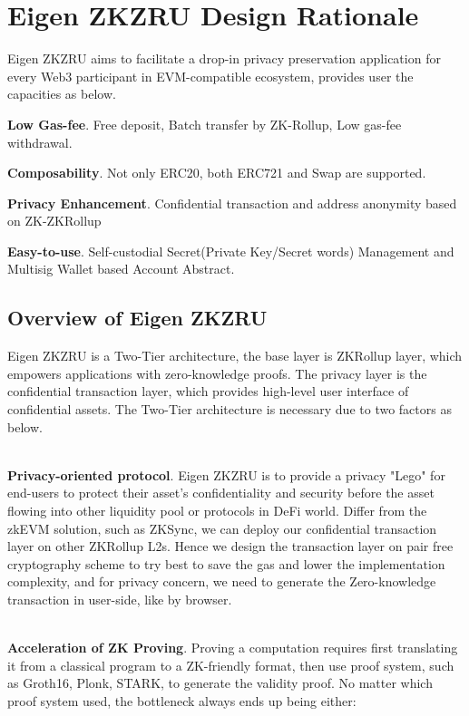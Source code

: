 \documentclass{article}
\begin{document}
\section{Eigen ZKZRU Design Rationale}

Eigen ZKZRU aims to facilitate a drop-in privacy preservation application for every Web3 participant in EVM-compatible ecosystem, provides user the capacities as below.

\noindent\textbf{Low Gas-fee}. Free deposit, Batch transfer by ZK-Rollup, Low gas-fee withdrawal.

\noindent\textbf{Composability}. Not only ERC20,  both ERC721 and Swap are supported.

\noindent\textbf{Privacy Enhancement}. Confidential transaction and address anonymity based on ZK-ZKRollup  

\noindent\textbf{Easy-to-use}. Self-custodial Secret(Private Key/Secret words) Management and Multisig Wallet based Account Abstract.


\subsection{Overview of Eigen ZKZRU}

Eigen ZKZRU is a Two-Tier architecture, the base layer is ZKRollup layer, which empowers applications with zero-knowledge proofs. The privacy layer is the confidential transaction layer, which provides high-level user interface of confidential assets. The Two-Tier architecture is necessary due to two factors as below.

~\\
\noindent\textbf{Privacy-oriented protocol}. Eigen ZKZRU is to provide a privacy "Lego" for end-users to protect their asset's confidentiality and security before the asset flowing into other liquidity pool or protocols in DeFi world. Differ from the zkEVM solution, such as ZKSync, we can deploy our confidential transaction layer on other ZKRollup L2s. Hence we design the transaction layer on pair free cryptography scheme to try best to save the gas and lower the implementation complexity, and for privacy concern, we need to generate the Zero-knowledge transaction in user-side, like by browser.

~\\
\noindent\textbf{Acceleration of ZK Proving}. Proving a computation requires first translating it from a classical program to a ZK-friendly format, then use proof system, such as Groth16, Plonk, STARK, to generate the validity proof. No matter which proof system used, the bottleneck always ends up being either:
\end{document}
